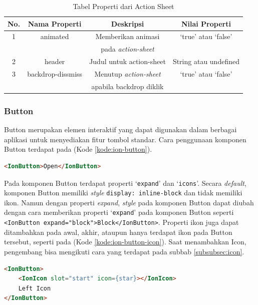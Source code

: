 \begin{table} [H]
    \centering
    \caption{Tabel Properti dari Action Sheet}
    \begin{tabular}{|c|c|c|c|}
    \hline
       No. & Nama Properti & Deskripsi & Nilai Properti \\ \hline
        1 & animated & Memberikan animasi & `true' atau `false'\\
         &  & pada \textit{action-sheet} & \\ \hline
        2 & header & Judul untuk action-sheet & String atau undefined \\ \hline
        3 & backdrop-dissmiss & Menutup \textit{action-sheet} & `true' atau `false' \\
         &  & apabila backdrop diklik & \\ \hline
    \end{tabular}
    \label{tab:action-sheet-property}
\end{table}

\subsubsection{Button}
Button merupakan elemen interaktif yang dapat digunakan dalam berbagai aplikasi untuk menyediakan fitur tombol standar. Cara penggunaan komponen Button terdapat pada (Kode \ref{kode:ion-button}).

\begin{lstlisting}[language=HTML, caption=Contoh Potongan Kode Button, label=kode:ion-button]
<IonButton>Open</IonButton>
\end{lstlisting}

Pada komponen Button terdapat properti `\texttt{expand}' dan `\texttt{icons}'. Secara \textit{default}, komponen Button memiliki \textit{style} \texttt{display: inline-block} dan tidak memiliki ikon. Namun dengan properti \textit{expand}, \textit{style} pada komponen Button dapat diubah dengan cara memberikan properti `\texttt{expand}' pada komponen Button seperti \texttt{<IonButton expand="block">Block</IonButton>}. Properti ikon juga dapat ditambahkan pada awal, akhir, ataupun hanya terdapat ikon pada Button tersebut, seperti pada (Kode \ref{kode:ion-button-icon}). Saat menambahkan Icon, pengembang bisa mengikuti cara yang terdapat pada subbab \ref{subsubsec:icon}.

\begin{lstlisting}[language=HTML, caption=Contoh Potongan Kode Button Menggunakan Icon, label=kode:ion-button-icon]
<IonButton>
    <IonIcon slot="start" icon={star}></IonIcon>
    Left Icon
</IonButton>
\end{lstlisting}

